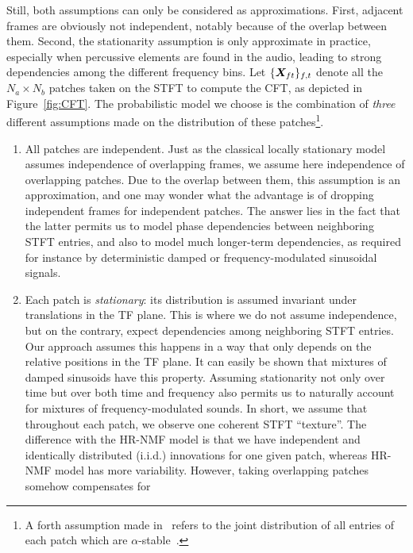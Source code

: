 Still, both assumptions can only be considered as approximations.
First, adjacent frames are obviously not independent, notably because
of the overlap between them. Second, the stationarity assumption is
only approximate in practice, especially when percussive elements are
found in the audio, leading to strong dependencies among the different
frequency bins. Let $\{ {\bm{X}}_{ft}\} _{f,t}$
denote all the $N_{a}\times N_{b}$ patches taken on the STFT to compute
the CFT, as depicted in Figure~\ref{fig:CFT}. The probabilistic
model we choose is the combination of \emph{three} different assumptions
made on the distribution of these patches\footnote{A forth assumption made in~\cite{stoeter16} refers to the joint distribution of all entries of each patch which are $\alpha$-stable~\cite{samoradnitsky94}.}.

\begin{enumerate}[leftmargin=0cm,itemindent=.5cm,labelwidth=\itemindent,labelsep=0cm,align=left]
\item All patches are independent. 
Just as the classical locally stationary
model~\cite{liutkus11t} assumes independence of overlapping frames,
we assume here independence of overlapping patches. Due to the
overlap between them, this assumption is an approximation,
and one may wonder what the advantage is of dropping independent frames
for independent patches. 
The answer lies in the fact that the latter permits us to model phase dependencies between neighboring STFT entries, and also to model much longer-term dependencies, as required for instance by deterministic damped or frequency-modulated sinusoidal signals.\label{enu:assumption_independent_patches}
\item Each patch is \emph{stationary}: its distribution
is assumed invariant under translations in the TF plane. This is where we do not assume independence, but on the contrary, expect dependencies among neighboring STFT entries. Our approach assumes this happens in a way that only depends on the relative positions in
the TF plane. It can easily be shown that mixtures of
damped sinusoids have this property. Assuming stationarity not only over time but over both time and frequency
also permits us to naturally account for mixtures of frequency-modulated
sounds. In short, we assume that throughout each patch, we observe
one coherent STFT ``texture''. The difference with the HR-NMF model is that we have independent and identically
distributed (i.i.d.) innovations for one given patch, whereas HR-NMF model has more variability. 
However, taking overlapping patches somehow compensates for

\end{enumerate}
